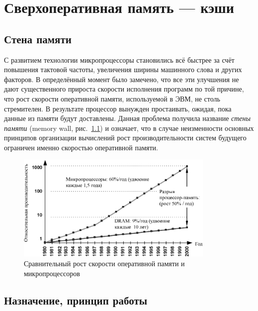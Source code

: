 \chapter{Сверхоперативная память --- кэши}\label{chapter11}


\section{Стена памяти}

С развитием технологии микропроцессоры становились всё быстрее за счёт повышения тактовой частоты, увеличения ширины машинного слова и других факторов. В определённый момент было замечено, что все эти улучшения не дают существенного прироста скорости исполнения программ по той причине, что рост скорости оперативной памяти, используемой в ЭВМ, не столь стремителен. В результате процессор вынужден простаивать, ожидая, пока данные из памяти будут доставлены. Данная проблема получила название \textit{стены памяти} (\abbr memory wall, рис.~\ref{fig:mem-wall}) и означает, что в случае неизменности основных принципов организации вычислений рост производительности систем будущего ограничен именно скоростью оперативной памяти. 

\begin{figure}[htb]
    \centering
    \includegraphics[width=0.85\textwidth]{./mem-wall-crop.pdf}
    \caption{Сравнительный рост скорости оперативной памяти и микропроцессоров}
    \label{fig:mem-wall}
\end{figure}

\section{Назначение, принцип работы}

